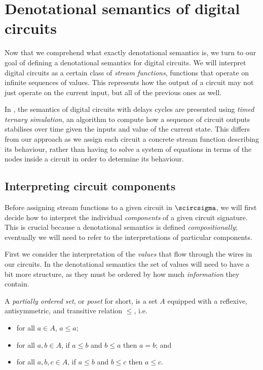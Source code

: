\section{Denotational semantics of digital circuits}\label{sec:circuits}

Now that we comprehend what exactly denotational semantics is, we turn to our
goal of defining a denotational semantics for digital circuits.
We will interpret digital circuits as a certain class of
\emph{stream functions}, functions that operate on infinite sequences of values.
This represents how the output of a circuit may not just operate on the current
input, but all of the previous ones as well.

\begin{remark}
    In \cite{mendler2012constructive}, the semantics of digital circuits with
    delays cycles are presented using \emph{timed ternary simulation}, an
    algorithm to compute how a sequence of circuit outputs stabilises over time
    given the inputs and value of the current state.
    This differs from our approach as we assign each circuit a concrete stream
    function describing its behaviour, rather than having to solve a system of
    equations in terms of the nodes inside a circuit in order to determine its
    behaviour.
\end{remark}

\subsection{Interpreting circuit components}\label{sec:interpreting-components}

Before assigning stream functions to a given circuit in \(\scircsigma\), we will
first decide how to interpret the individual \emph{components} of a given
circuit signature.
This is crucial because a denotational semantics is defined
\emph{compositionally}; eventually we will need to refer to the interpretations
of particular components.

First we consider the interpretation of the \emph{values} that flow through the
wires in our circuits.
In the denotational semantics the set of values will need to have a bit more
structure, as they must be ordered by how much \emph{information} they contain.

\begin{definition}
    A \emph{partially ordered set}, or \emph{poset} for short, is a set \(A\)
    equipped with a reflexive, antisymmetric, and transitive relation \(\leq\),
    i.e.\
    \begin{itemize}
        \item for all \(a \in A\), \(a \leq a\);
        \item for all \(a, b \in A\), if \(a \leq b\) and \(b \leq a\) then
              \(a = b\); and
        \item for all \(a, b, c \in A\), if \(a \leq b\) and \(b \leq c\) then
              \(a \leq c\).
    \end{itemize}
\end{definition}

